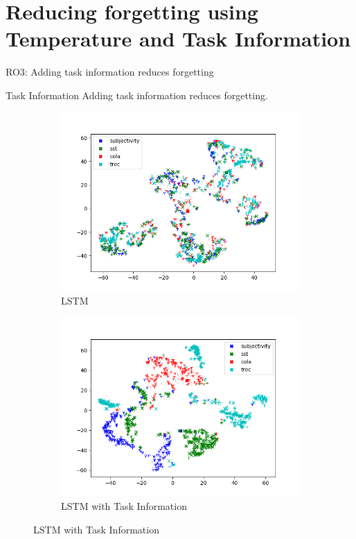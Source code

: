 \documentclass[aspectratio=169]{beamer}
\begin{document}
	\section{Reducing forgetting using Temperature and Task Information}
	\begin{frame}{RO3: Adding task information reduces forgetting}
	    \begin{block}{Task Information}
		Adding task information reduces forgetting.
	    \end{block}\pause
	\begin{figure}
	\centering
	    \begin{subfigure}[b]{0.45\textwidth}
	      \includegraphics[scale=0.9,width=\textwidth]{lstm_normal}
	      \caption{LSTM}
	    \end{subfigure}
	    \begin{subfigure}[b]{0.45\textwidth}
	      \includegraphics[scale=0.9,width=\textwidth]{lstm_task_projection}
	      \caption{LSTM with Task Information}
	    \end{subfigure}
	\end{figure}
	 \end{frame}
\end{document}
